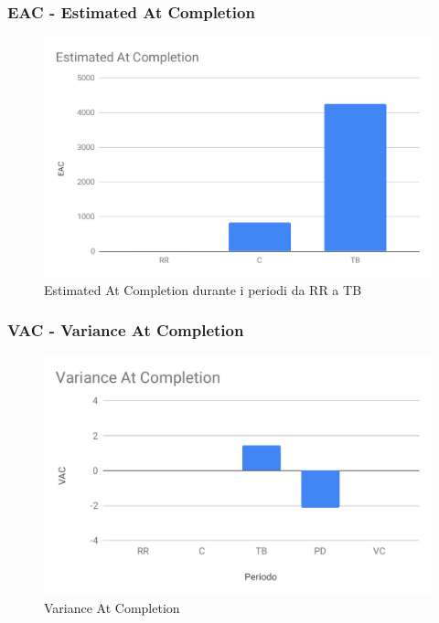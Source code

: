 \subsubsection{EAC - Estimated At Completion}
\begin{figure}[H]
	\centering
	\includegraphics[scale=0.55]{res/images/eac.pdf}
	\caption{Estimated At Completion durante i periodi da RR a TB}
\end{figure}



\subsubsection{VAC - Variance At Completion}

\begin{figure}[H]
	\centering
	\includegraphics[scale=0.8]{res/images/RQ/vac.pdf}
	\caption{Variance At Completion}
\end{figure}
\pagebreak

